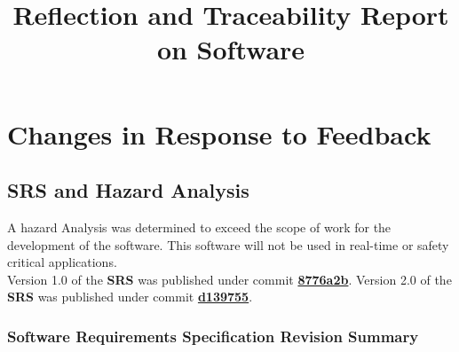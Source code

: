 \documentclass{article}
\title{Reflection and Traceability Report on \progname{} Software}
\author{\authname}
\date{}
\begin{document}
\maketitle

\section{Changes in Response to Feedback}\label{feedback_deltas}

\subsection{SRS and Hazard Analysis}

A hazard Analysis was determined to exceed the scope of work for the development of the \progname{} software. This software will not be used in real-time or safety critical applications.\\ 

\noindent Version 1.0 of the \textbf{SRS} was published under commit \href{https://github.com/KiranSingh15/CAS-741-Image-Correspondences/commit/8776a2b2180b8d8d170e9e1b7e68392f4b424092#diff-135354e346cf609e826d36a28ad63746a7c537c4fcc1dec1663b35a4af2355f9}{\textbf{8776a2b}}. Version 2.0 of the \textbf{SRS} was published under commit \href{https://github.com/KiranSingh15/CAS-741-Image-Correspondences/commit/d139755d96b3c7b316cd7f96106ef69df3ab228a}{\textbf{d139755}}. 

\subsubsection*{Software Requirements Specification Revision Summary}
\end{document}
